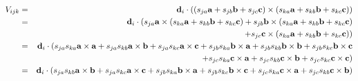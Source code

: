 \documentclass[12pt]{amsbook}
\begin{document}
\\
\begin{eqnarray*}
V_{ijk}&=&{\bf d}_i\cdot((s_{ja}{\bf a}+s_{jb}{\bf b}+s_{jc}{\bf c})\times(s_{ka}{\bf a}+s_{kb}{\bf b}+s_{kc}{\bf c}))\\
&=&{\bf d}_i\cdot(s_{ja}{\bf a}\times(s_{ka}{\bf a}+s_{kb}{\bf b}+s_{kc}{\bf c})+s_{jb}{\bf b}\times(s_{ka}{\bf a}+s_{kb}{\bf b}+s_{kc}{\bf c})\\
&& \ \ \ \ \ \ +s_{jc}{\bf c}\times(s_{ka}{\bf a}+s_{kb}{\bf b}+s_{kc}{\bf c}))\\
&=&{\bf d}_i\cdot(s_{ja}s_{ka}{\bf a}\times{\bf a}+s_{ja}s_{kb}{\bf a}\times{\bf b}+s_{ja}s_{kc}{\bf a}\times{\bf c}+s_{jb}s_{ka}{\bf b}\times{\bf a}+s_{jb}s_{kb}{\bf b}\times{\bf b}+s_{jb}s_{kc}{\bf b}\times{\bf c}\\
&& \ \ \ \ \ \ +s_{jc}s_{ka}{\bf c}\times{\bf a}+s_{jc}s_{kb}{\bf c}\times{\bf b}+s_{jc}s_{kc}{\bf c}\times{\bf c})\\
&=&{\bf d}_i\cdot(s_{ja}s_{kb}{\bf a}\times{\bf b}+s_{ja}s_{kc}{\bf a}\times{\bf c}+s_{jb}s_{ka}{\bf b}\times{\bf a}+s_{jb}s_{kc}{\bf b}\times{\bf c}+s_{jc}s_{ka}{\bf c}\times{\bf a}+s_{jc}s_{kb}{\bf c}\times{\bf b})\\
\end{eqnarray*}
\end{document}
